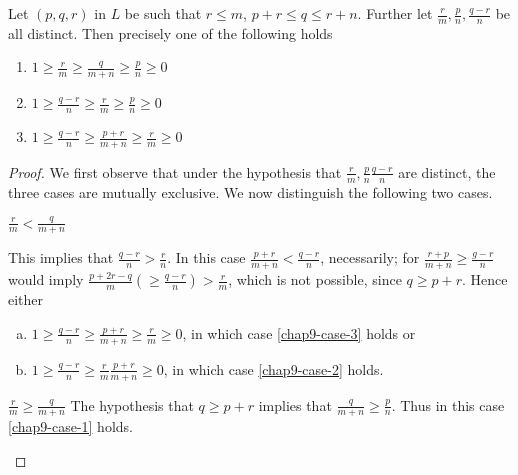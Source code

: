 \begin{seclem}\label{chap9-lemma-5.1}
Let $(p,q,r)$ in $L$ be such that $ r \leq m$, $p + r \leq q \leq r + n$. Further let $\frac{r}{m}, \frac{p}{n}, \frac{q-r}{n}$ be all distinct. Then precisely one of the following holds
\begin{enumerate}[{\rm (1)}]
\item $1 \geq \frac{r}{m}\geq \frac{q}{m+n} \geq \frac{p}{n} \geq 0$\label{chap9-lemma5.1-enum-1}

\item $1 \geq \frac{q-r}{n} \geq \frac{r}{m} \geq \frac{p}{n} \geq 0$ \label{chap9-lemma5.1-enum-2}

\item $1 \geq \frac{q-r}{n} \geq \frac{p+r}{m+n} \geq \frac{r}{m} \geq 0$\label{chap9-lemma5.1-enum-3}
\end{enumerate}
\end{seclem}

\begin{proof}
We first observe that under the hypothesis that $\frac{r}{m}, \frac{p}{n} \frac{q-r}{n}$ are distinct, the three cases are mutually exclusive. We now distinguish the following two cases. 

\setcounter{case}{0}
\begin{case}\label{chap9-case-1}
$\frac{r}{m} < \frac{q}{m+n}$

\noindent
This implies that $\frac{q-r}{n} > \frac{r}{n}$. In this case $\frac{p+r}{m+n} < \frac{q-r}{n}$, necessarily; for $\frac{r+p}{m+n} \geq \frac{g-r}{n}$ would imply $\frac{p+2r-q}{m}(\geq \frac{q-r}{n}) > \frac{r}{m}$, which is not possible, since $q \geq p +r$. Hence either
\begin{enumerate}[(a)]
 \item $1 \geq \frac{q-r}{n} \geq \frac{p+r}{m+n} \geq \frac{r}{m} \geq 0$, in which case
 \eqref{chap9-case-3} holds or\label{chap9-case-1-enum-a}
 \item $ 1 \geq \frac{q-r}{n} \geq \frac{r}{m} \frac{p+r}{m+n} \geq 0$, in which case \eqref{chap9-case-2}
 holds.\label{chap9-case-1-enum-b}
\end{enumerate}
\end{case}

\begin{case}\label{chap9-case-2}
$\frac{r}{m}\geq \frac{q}{m+n}$  The hypothesis that $q\geq p + r$ implies that $ \frac{q}{m+n} \geq \frac{p}{n}$.
Thus in this case \eqref{chap9-case-1} holds.
\end{case}
\end{proof}

